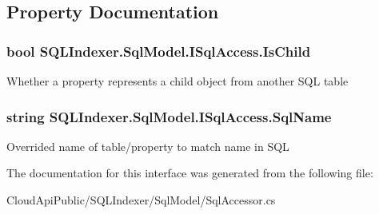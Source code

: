\subsection{Property Documentation}
\hypertarget{interface_s_q_l_indexer_1_1_sql_model_1_1_i_sql_access_a84a951b6e5f0f96bffba9fc5bf9c134c}{
\subsubsection[{Is\-Child}]{\setlength{\rightskip}{0pt plus 5cm}bool S\-Q\-L\-Indexer.\-Sql\-Model.\-I\-Sql\-Access.\-Is\-Child\hspace{0.3cm}{\ttfamily [get]}}}\label{interface_s_q_l_indexer_1_1_sql_model_1_1_i_sql_access_a84a951b6e5f0f96bffba9fc5bf9c134c}


Whether a property represents a child object from another S\-Q\-L table 

\hypertarget{interface_s_q_l_indexer_1_1_sql_model_1_1_i_sql_access_ae5ddc708136593649ec331138a1aefea}{
\subsubsection[{Sql\-Name}]{\setlength{\rightskip}{0pt plus 5cm}string S\-Q\-L\-Indexer.\-Sql\-Model.\-I\-Sql\-Access.\-Sql\-Name\hspace{0.3cm}{\ttfamily [get]}}}\label{interface_s_q_l_indexer_1_1_sql_model_1_1_i_sql_access_ae5ddc708136593649ec331138a1aefea}


Overrided name of table/property to match name in S\-Q\-L 



The documentation for this interface was generated from the following file\-:\begin{DoxyCompactItemize}
\item 
Cloud\-Api\-Public/\-S\-Q\-L\-Indexer/\-Sql\-Model/Sql\-Accessor.\-cs\end{DoxyCompactItemize}
